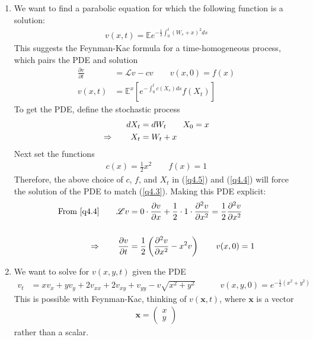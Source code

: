 \documentclass[12pt]{article}
\theoremstyle{plain}
\theoremstyle{definition}
\theoremstyle{remark}
\begin{document}
\begin{enumerate}
  \item %
    We want to find a parabolic equation for which the following
    function is a solution:
    \begin{align}
      v(x,t) = \mathbb{E}e^{-\frac{1}{2} \int^t_0 (W_s+x)^2 ds}
      \label{q4.1}
    \end{align}
    This suggests the Feynman-Kac formula for a time-homogeneous
    process, which pairs the PDE and solution
    \begin{align}
      \frac{\partial v}{\partial t}
        &= \mathscr{L}v - cv \qquad v(x,0) = f(x)\label{q4.2}\\
      v(x,t) &=
        \mathbb{E}^x\left[
          e^{-\int^t_0 c(X_s) ds}f(X_t)
        \right]
      \label{q4.3}
    \end{align}
    To get the PDE, define the stochastic process
    \begin{align}
      dX_t &= dW_t \qquad X_0 = x \notag\\
      \Rightarrow \qquad
      X_t &= W_t + x \label{q4.4}
    \end{align}
    Next set the functions
    \begin{align}
      c(x) = \frac{1}{2}x^2\qquad
      f(x) = 1
      \label{q4.5}
    \end{align}
    Therefore, the above choice of $c$, $f$, and $X_t$ in (\ref{q4.5})
    and (\ref{q4.4}) will force the solution of the PDE to match
    (\ref{q4.3}). Making this PDE explicit:
    \begin{align*}
      \text{From~\ref{q4.4}}
      \qquad
      \mathscr{L}v &= 0 \cdot \frac{\partial v}{\partial x}
        + \frac{1}{2} \cdot 1 \cdot \frac{\partial^2 v}{\partial x^2}
        = \frac{1}{2} \frac{\partial^2 v}{\partial x^2}
        \\\\
      \Rightarrow\qquad
      \frac{\partial v}{\partial t}
      &= \frac{1}{2}\left(\frac{\partial^2 v}{\partial x^2}
      - x^2 v\right)
      \qquad v(x,0) = 1
    \end{align*}

  \item %
    We want to solve for $v(x,y,t)$ given the PDE
    \begin{align*}
      v_t
      &=
      x v_x + y v_y + 2 v_{xx} + 2 v_{xy} + v_{yy}
      -v\sqrt{x^2+y^2}
      \quad\qquad v(x,y,0) = e^{-\frac{1}{2}(x^2+y^2)}
    \end{align*}
    This is possible with Feynman-Kac, thinking of $v(\mathbf{x},t)$,
    where $\mathbf{x}$ is a vector
    \begin{align*}
      \mathbf{x} = \begin{pmatrix} x \\ y \end{pmatrix}
    \end{align*}
    rather than a scalar.


\end{enumerate}
\end{document}
